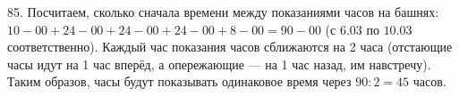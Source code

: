85. Посчитаем, сколько сначала времени между показаниями часов на башнях: $10-00+24-00+24-00+24-00+8-00=90-00$ (с $6.03$ по $10.03$ соответственно). Каждый час показания часов сближаются на 2 часа (отстающие часы идут на 1 час вперёд, а опережающие --- на 1 час назад, им навстречу). Таким образов, часы будут показывать одинаковое время через $90:2=45$ часов.\\
